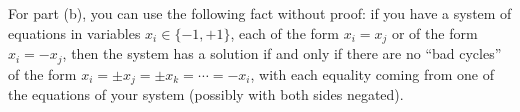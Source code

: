 \documentclass[12pt]{article}
\begin{document}
\begin{enumerate}
\begin{enumerate}
\end{enumerate}


For part (b), you can use the following fact without proof: if you have a system of equations in variables $x_i \in \{-1,+1\}$, each of the form $x_i = x_j$ or of the form $x_i = -x_j$, then the system has a solution if and only if there are no ``bad cycles'' of the form $x_i = \pm x_j = \pm x_k = \cdots = -x_i$, with each equality coming from one of the equations of your system (possibly with both sides negated).



\end{enumerate}

\end{document}
